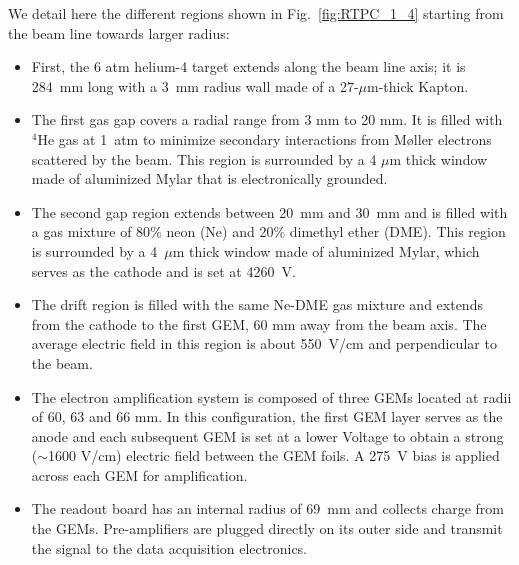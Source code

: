 \documentclass[preprint,5p]{elsarticle}
\begin{document}
We detail here the different regions shown in Fig.~\ref{fig:RTPC_1_4} starting 
from the beam line towards larger radius:\\
\begin{itemize}
   \item First, the 6 atm helium-4 target extends along the beam line axis; it 
      is 284~mm long with a 3~mm radius wall made of a 27-$\mu$m-thick Kapton.
   \item The first gas gap covers a radial range from 3 mm to 20 mm. It is 
      filled with $^{4}$He gas at 1~atm to minimize secondary interactions from
      M\o ller electrons scattered by the beam. This 
      region is surrounded by a 4 $\mu$m thick window made of aluminized Mylar 
      that is electronically grounded.
   \item The second gap region extends between 20~mm and 30~mm and is filled with a 
      gas mixture of 80$\%$ neon (Ne) and 20$\%$ dimethyl ether (DME). This region 
      is surrounded by a 4~$\mu$m thick window made of aluminized Mylar, which 
      serves as the cathode and is set at 4260~V.
   \item The drift region is filled with the same Ne-DME gas mixture and extends 
      from the cathode to the first GEM, 60 mm away 
      from the beam axis. The average electric field in this region is about 550~V/cm 
      and perpendicular to the beam.
   \item The electron amplification system is composed of three GEMs located at 
      radii of 60, 63 and 66 mm. In this configuration, the first GEM layer 
      serves as the anode and each subsequent GEM is set at a lower Voltage to
      obtain a strong ($\sim$1600 V/cm) electric field between the GEM foils. A 
      275~V bias is applied across each GEM for amplification.
   \item The readout board has an internal radius of 69~mm and collects charge
     from the GEMs. Pre-amplifiers are plugged directly on its outer side and
     transmit the signal to the data acquisition electronics.
\end{itemize}
\end{document}
